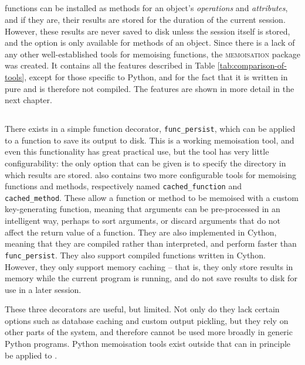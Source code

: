 \documentclass{deliverablereport}
\newcommand{\Memoisation}{\textsc{memoisation}}
\begin{document}
\subsection{\GAP}
\GAP functions can be installed as methods for an object's
\emph{operations} and \emph{attributes}, and if they are, their results are
stored for the duration of the current \GAP session.  However, these results are
never saved to disk unless the session itself is stored, and the option is only
available for methods of an object.  Since there is a lack of any other
well-established tools for memoising functions, the \Memoisation{} package was
created.  It contains all the features described in Table
\ref{tab:comparison-of-tools}, except for those specific to Python, and for the
fact that it is written in pure \GAP and is therefore not compiled.  The
features are shown in more detail in the next chapter.

\subsection{\Sage}
There exists in \Sage a simple function decorator, \texttt{func\_persist}, which
can be applied to a function to save its output to disk.  This is a working
memoisation tool, and even this functionality has great practical use, but the
tool has very little configurability: the only option that can be given is to
specify the directory in which results are stored.  \Sage also contains two more
configurable tools for memoising functions and methods, respectively named
\texttt{cached\_function} and \texttt{cached\_method}.  These allow a function
or method to be memoised with a custom key-generating function, meaning that
arguments can be pre-processed in an intelligent way, perhaps to sort arguments,
or discard arguments that do not affect the return value of a function.
They are also implemented in Cython, meaning that they are compiled
rather than interpreted, and perform
faster than \texttt{func\_persist}. They also support compiled functions written in
Cython.
However, they only support memory caching -- that is, they only store results in
memory while the current program is running, and do not save results to disk for
use in a later session.

These three decorators are useful, but limited.  Not only do they lack certain
options such as database caching and custom output pickling, but they rely on
other parts of the \Sage system, and therefore cannot be used more broadly in
generic Python programs.  Python memoisation tools exist outside \Sage that can
in principle be applied to \Sage.
\end{document}
